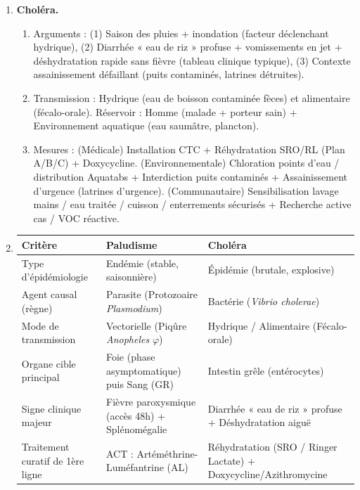 \documentclass[11pt]{article}
\begin{document}
\begin{corrige}
\begin{enumerate}
    \item \textbf{Choléra.}
    \begin{enumerate}
        \item Arguments : (1) Saison des pluies + inondation (facteur déclenchant hydrique), (2) Diarrhée « eau de riz » profuse + vomissements en jet + déshydratation rapide sans fièvre (tableau clinique typique), (3) Contexte assainissement défaillant (puits contaminés, latrines détruites).
        \item Transmission : Hydrique (eau de boisson contaminée fèces) et alimentaire (fécalo-orale). Réservoir : Homme (malade + porteur sain) + Environnement aquatique (eau saumâtre, plancton).
        \item Mesures : (Médicale) Installation CTC + Réhydratation SRO/RL (Plan A/B/C) + Doxycycline. (Environnementale) Chloration points d'eau / distribution Aquatabs + Interdiction puits contaminés + Assainissement d'urgence (latrines d'urgence). (Communautaire) Sensibilisation lavage mains / eau traitée / cuisson / enterrements sécurisés + Recherche active cas / VOC réactive.
    \end{enumerate}
    \item
    \begin{center}
    \begin{tabularx}{\linewidth}{|l|X|X|}\hline
    \textbf{Critère} & \textbf{Paludisme} & \textbf{Choléra} \\ \hline
    Type d'épidémiologie & Endémie (stable, saisonnière) & Épidémie (brutale, explosive) \\ \hline
    Agent causal (règne) & Parasite (Protozoaire \emph{Plasmodium}) & Bactérie (\emph{Vibrio cholerae}) \\ \hline
    Mode de transmission & Vectorielle (Piqûre \emph{Anopheles} $\varphi$) & Hydrique / Alimentaire (Fécalo-orale) \\ \hline
    Organe cible principal & Foie (phase asymptomatique) puis Sang (GR) & Intestin grêle (entérocytes) \\ \hline
    Signe clinique majeur & Fièvre paroxysmique (accès 48h) + Splénomégalie & Diarrhée « eau de riz » profuse + Déshydratation aiguë \\ \hline
    Traitement curatif de 1ère ligne & ACT : Artéméthrine-Luméfantrine (AL) & Réhydratation (SRO / Ringer Lactate) + Doxycycline/Azithromycine \\ \hline

\end{tabularx}
\end{center}
\end{enumerate}
\end{corrige}
\end{document}
